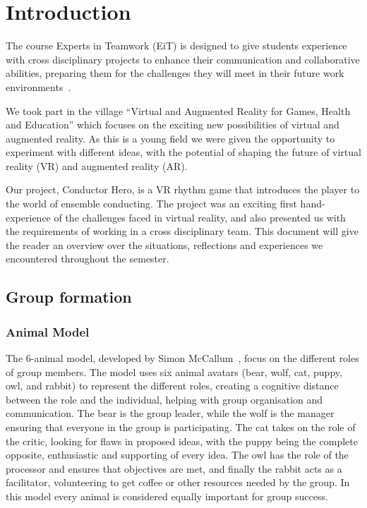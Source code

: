 \chapter{Introduction}
The course Experts in Teamwork (EiT) is designed to give students experience with cross disciplinary projects to enhance their communication and collaborative abilities, preparing them for the challenges they will meet in their future work environments~\cite{ntnu_what_is_eit}. 

We took part in the village “Virtual and Augmented Reality for Games, Health and Education” which focuses on the exciting new possibilities of virtual and augmented reality. As this is a young field we were given the opportunity to experiment with different ideas, with the potential of shaping the future of virtual reality (VR) and augmented reality (AR). 

Our project, Conductor Hero, is a VR rhythm game that introduces the player to the world of ensemble conducting. The project was an exciting first hand-experience of the challenges faced in virtual reality, and also presented us with the requirements of working in a cross disciplinary team. This document will give the reader an overview over the situations, reflections and experiences we encountered throughout the semester.


\section{Group formation}
\subsection{Animal Model}
The 6-animal model, developed by Simon McCallum~\cite{six_animal_model}, focus on the different roles of group members. The model uses six animal avatars (bear, wolf, cat, puppy, owl, and rabbit) to represent the different roles, creating a cognitive distance between the role and the individual, helping with group organisation and communication. The bear is the group leader, while the wolf is the manager ensuring that everyone in the group is participating. The cat takes on the role of the critic, looking for flaws in proposed ideas, with the puppy being the complete opposite, enthusiastic and supporting of every idea. The owl has the role of the processor and ensures that objectives are met, and finally the rabbit acts as a facilitator, volunteering to get coffee or other resources needed by the group. In this model every animal is considered equally important for group success.

